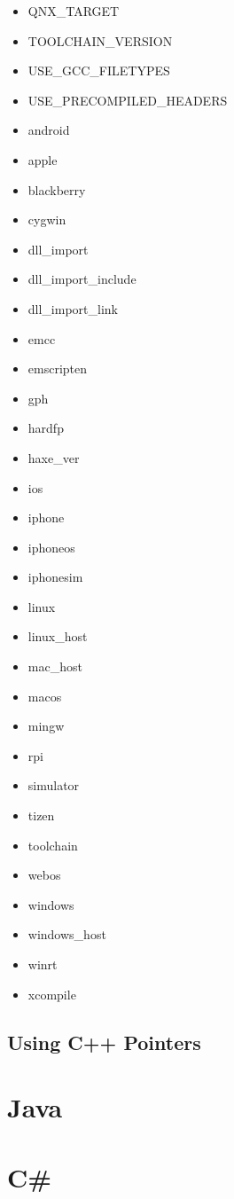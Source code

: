 \begin{itemize}
    \item QNX_TARGET
    \item TOOLCHAIN_VERSION
    \item USE_GCC_FILETYPES
    \item USE_PRECOMPILED_HEADERS
    \item android
    \item apple
    \item blackberry
    \item cygwin
    \item dll_import
    \item dll_import_include
    \item dll_import_link
    \item emcc
    \item emscripten
    \item gph
    \item hardfp
    \item haxe_ver
    \item ios
    \item iphone
    \item iphoneos
    \item iphonesim
    \item linux
    \item linux_host
    \item mac_host
    \item macos
    \item mingw
    \item rpi
    \item simulator
    \item tizen
    \item toolchain
    \item webos
    \item windows
    \item windows_host
    \item winrt
    \item xcompile
\end{itemize}

\subsection{Using C++ Pointers}
\label{target-cpp-pointers}

\section{Java}
\label{target-java}

\section{C\#}
\label{target-cs}

